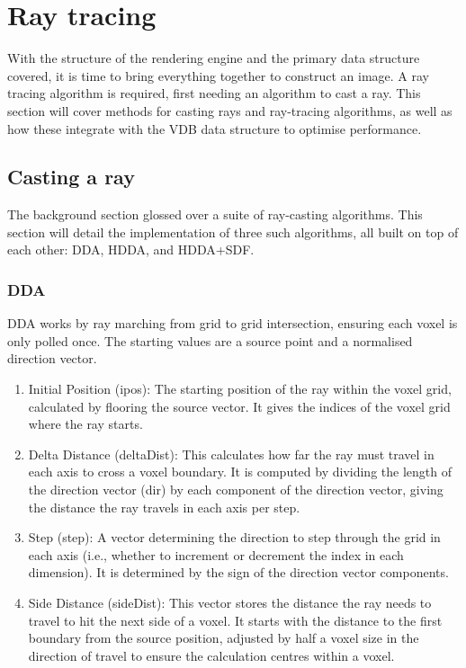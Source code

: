 
\section{Ray tracing}
With the structure of the rendering engine and the primary data structure covered, it is time to bring everything together to construct an image.
A ray tracing algorithm is required, first needing an algorithm to cast a ray.
This section will cover methods for casting rays and ray-tracing algorithms, as well as how these integrate with the VDB data structure to optimise performance.

\subsection{Casting a ray}
The background section glossed over a suite of ray-casting algorithms.
This section will detail the implementation of three such algorithms, all built on top of each other: DDA, HDDA, and HDDA+SDF.

\subsubsection{DDA}
\acrshort{DDA} works by ray marching from grid to grid intersection, ensuring each voxel is only polled once.
The starting values are a source point and a normalised direction vector.
\begin{enumerate}
  \item Initial Position (ipos): The starting position of the ray within the voxel grid, calculated by flooring the source vector. It gives the indices of the voxel grid where the ray starts.
  \item Delta Distance (deltaDist): This calculates how far the ray must travel in each axis to cross a voxel boundary. It is computed by dividing the length of the direction vector (dir) by each component of the direction vector, giving the distance the ray travels in each axis per step.
  \item Step (step): A vector determining the direction to step through the grid in each axis (i.e., whether to increment or decrement the index in each dimension). It is determined by the sign of the direction vector components.
  \item Side Distance (sideDist): This vector stores the distance the ray needs to travel to hit the next side of a voxel. It starts with the distance to the first boundary from the source position, adjusted by half a voxel size in the direction of travel to ensure the calculation centres within a voxel.
\end{enumerate}

